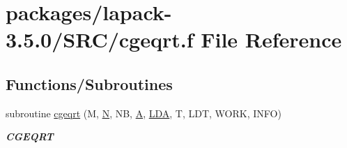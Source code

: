\hypertarget{cgeqrt_8f}{}\section{packages/lapack-\/3.5.0/\+S\+R\+C/cgeqrt.f File Reference}
\label{cgeqrt_8f}
\subsection*{Functions/\+Subroutines}
\begin{DoxyCompactItemize}
\item 
subroutine \hyperlink{group__complexGEcomputational_gaf7103c1ce604baf7b0f7946496a72baf}{cgeqrt} (M, \hyperlink{polmisc_8c_a0240ac851181b84ac374872dc5434ee4}{N}, N\+B, \hyperlink{classA}{A}, \hyperlink{example__user_8c_ae946da542ce0db94dced19b2ecefd1aa}{L\+D\+A}, T, L\+D\+T, W\+O\+R\+K, I\+N\+F\+O)
\begin{DoxyCompactList}\small\item\em {\bfseries C\+G\+E\+Q\+R\+T} \end{DoxyCompactList}\end{DoxyCompactItemize}
